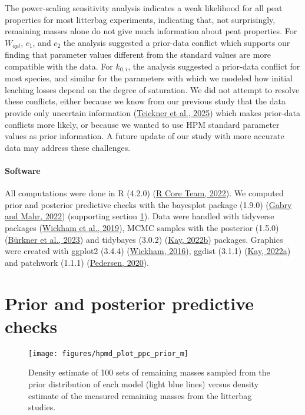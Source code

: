 \documentclass[
  12pt,
]{article}
\begin{document}
The power-scaling sensitivity analysis indicates a weak likelihood for all peat properties for most litterbag experiments, indicating that, not surprisingly, remaining masses alone do not give much information about peat properties. For \(W_{opt}\), \(c_{1}\), and \(c_{2}\) the analysis suggested a prior-data conflict which supports our finding that parameter values different from the standard values are more compatible with the data. For \(k_{0,i}\), the analysis suggested a prior-data conflict for most species, and similar for the parameters with which we modeled how initial leaching losses depend on the degree of saturation. We did not attempt to resolve these conflicts, either because we know from our previous study that the data provide only uncertain information (\protect\hyperlink{ref-Teickner.2025}{Teickner et al., 2025}) which makes prior-data conflicts more likely, or because we wanted to use HPM standard parameter values as prior information. A future update of our study with more accurate data may address these challenges.

\hypertarget{software}{%
\paragraph*{Software}\label{software}}

All computations were done in R (4.2.0) (\protect\hyperlink{ref-RCoreTeam.2022}{R Core Team, 2022}). We computed prior and posterior predictive checks with the bayesplot package (1.9.0) (\protect\hyperlink{ref-Gabry.2022}{Gabry and Mahr, 2022}) (supporting section \ref{sup-3}). Data were handled with tidyverse packages (\protect\hyperlink{ref-Wickham.2019}{Wickham et al., 2019}), MCMC samples with the posterior (1.5.0) (\protect\hyperlink{ref-Burkner.2023}{Bürkner et al., 2023}) and tidybayes (3.0.2) (\protect\hyperlink{ref-Kay.2022}{Kay, 2022b}) packages. Graphics were created with ggplot2 (3.4.4) (\protect\hyperlink{ref-Wickham.2016}{Wickham, 2016}), ggdist (3.1.1) (\protect\hyperlink{ref-Kay.2022a}{Kay, 2022a}) and patchwork (1.1.1) (\protect\hyperlink{ref-Pedersen.2020}{Pedersen, 2020}).

\hypertarget{sup-3}{%
\section{Prior and posterior predictive checks}\label{sup-3}}



\begin{figure}[H]

{\centering \texttt{[image: figures/hpmd\_plot\_ppc\_prior\_m]} 

}

\caption{Density estimate of 100 sets of remaining masses sampled from the prior distribution of each model (light blue lines) versus density estimate of the measured remaining masses from the litterbag studies.}\label{fig:sup-hpmd-plot-ppc-prior-m}
\end{figure}
\end{document}
